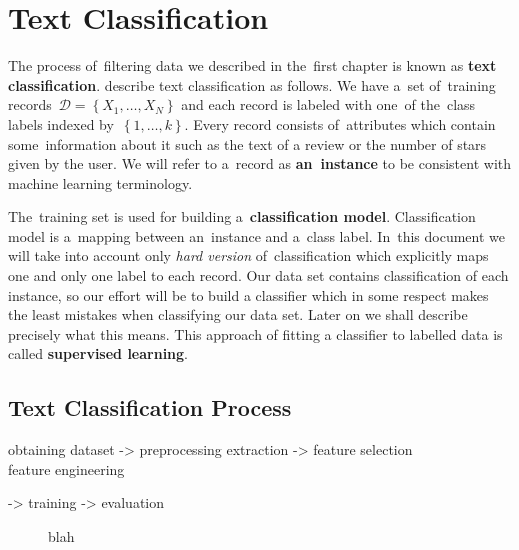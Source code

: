 \chapter{Text Classification}


The process of~filtering data we described in the~first chapter is known as {\bf text classification}.
\citet{AggZhai12} describe text classification as follows.
We have a~set of~training records~$\mathcal{D} = \left\{X_1, \ldots, X_N\right\}$ and each record is labeled with one~of the~class labels indexed by~$\left\{1,\ldots, k\right\}$.
Every record consists of~attributes which contain some~information about it such as the text of a review or the number of stars given by the user.
We will refer to a~record as {\bf an~instance} to be consistent with machine learning terminology.

The~training set is used for building a~{\bf classification model}. Classification model is a~mapping between an~instance and a~class label.
In~this document we will take into account only \emph{hard version} of~classification which explicitly maps one and only one label to each record.  
Our data set contains classification of each instance, so our effort will be to build a classifier which in some respect makes the least mistakes when classifying our data set.
Later on we shall describe precisely what this means.
This approach of fitting a classifier to labelled data is called {\bf supervised learning}.

\section{Text Classification Process}

\begin{code}
obtaining dataset
-> preprocessing {extraction} -> feature selection
 ^^^^^^^^^^^^^^^^^^^^^^^^^^^^^^^^^^^^^^^^^^^^^^^^^^^^^^
    		feature engineering

-> training -> evaluation
\end{code}
\begin{figure}
	blah
\label{cls_process}
\end{figure}

